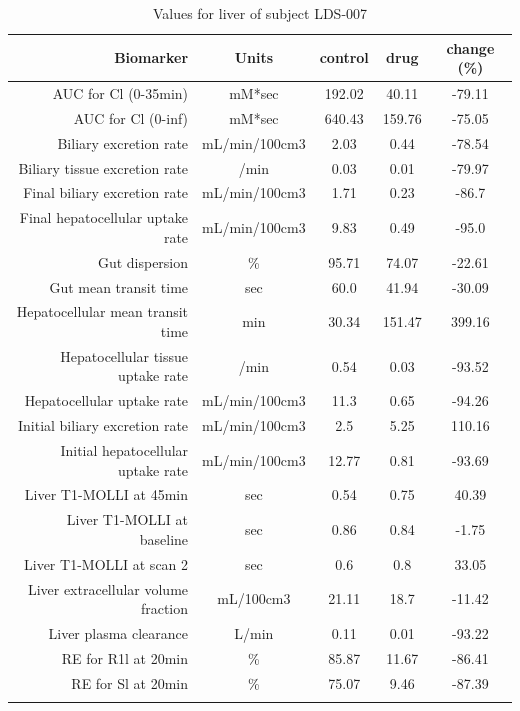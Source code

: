 \documentclass{epflreport}%
\begin{document}
%
\clearpage%
\begin{longtable}{rcccc}%
\hline%
Biomarker&Units&control&drug&change (\%)\\%
\hline%
AUC for Cl (0{-}35min)&mM*sec&192.02&40.11&{-}79.11\\%
AUC for Cl (0{-}inf)&mM*sec&640.43&159.76&{-}75.05\\%
Biliary excretion rate&mL/min/100cm3&2.03&0.44&{-}78.54\\%
Biliary tissue excretion rate&/min&0.03&0.01&{-}79.97\\%
Final biliary excretion rate&mL/min/100cm3&1.71&0.23&{-}86.7\\%
Final hepatocellular uptake rate&mL/min/100cm3&9.83&0.49&{-}95.0\\%
Gut dispersion&\%&95.71&74.07&{-}22.61\\%
Gut mean transit time&sec&60.0&41.94&{-}30.09\\%
Hepatocellular mean transit time&min&30.34&151.47&399.16\\%
Hepatocellular tissue uptake rate&/min&0.54&0.03&{-}93.52\\%
Hepatocellular uptake rate&mL/min/100cm3&11.3&0.65&{-}94.26\\%
Initial biliary excretion rate&mL/min/100cm3&2.5&5.25&110.16\\%
Initial hepatocellular uptake rate&mL/min/100cm3&12.77&0.81&{-}93.69\\%
Liver T1{-}MOLLI at 45min&sec&0.54&0.75&40.39\\%
Liver T1{-}MOLLI at baseline&sec&0.86&0.84&{-}1.75\\%
Liver T1{-}MOLLI at scan 2&sec&0.6&0.8&33.05\\%
Liver extracellular volume fraction&mL/100cm3&21.11&18.7&{-}11.42\\%
Liver plasma clearance&L/min&0.11&0.01&{-}93.22\\%
RE for R1l at 20min&\%&85.87&11.67&{-}86.41\\%
RE for Sl at 20min&\%&75.07&9.46&{-}87.39\\%
\hline%
\caption{Values for liver of subject LDS-007} \\%
\end{longtable}%
\end{document}
